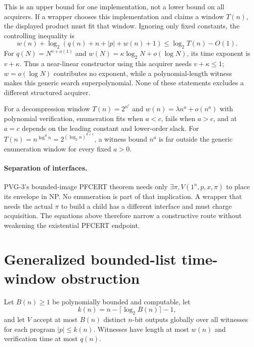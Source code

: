 \documentclass[11pt]{article}
\begin{document}
This is an upper bound for one implementation, not a lower bound on all
acquirers.  If a wrapper chooses this implementation and claims a window
$T(n)$, the displayed product must fit that window.  Ignoring only fixed
constants, the controlling inequality is
\[
 w(n)+\log_2(q(n)+n+|p|+w(n)+1)
 \le \log_2 T(n)-O(1).                 \tag{1}
\]
For $q(N)=N^{v+o(1)}$ and
$w(N)=\kappa\log_2N+o(\log N)$, its time exponent is
$v+\kappa$.  Thus a near-linear constructor using this acquirer needs
$v+\kappa\le1$; $w=o(\log N)$ contributes no exponent, while a
polynomial-length witness makes this generic search superpolynomial.
None of these statements excludes a different structured acquirer.

For a decompression window $T(n)=2^{n^c}$ and
$w(n)=\lambda n^a+o(n^a)$ with polynomial verification, enumeration fits
when $a<c$, fails when $a>c$, and at $a=c$ depends on the leading constant
and lower-order slack.  For
$T(n)=n^{\log^d n}=2^{(\log_2 n)^{d+1}}$, a witness bound $n^a$ is far
outside the generic enumeration window for every fixed $a>0$.

\paragraph{Separation of interfaces.}
PVG-3's bounded-image PFCERT theorem needs only
$\exists\pi,V(1^n,p,x,\pi)$ to place its envelope in NP.  No enumeration
is part of that implication.  A wrapper that needs the actual $\pi$ to
build a child has a different interface and must charge acquisition.  The
equations above therefore narrow a constructive route without weakening
the existential PFCERT endpoint.

\section{Generalized bounded-list time-window obstruction}
Let $B(n)\ge1$ be polynomially bounded and computable, let
\[
 k(n)=n-\lceil\log_2 B(n)\rceil-1,
\]
and let $V$ accept at most $B(n)$ distinct $n$-bit outputs globally over
all witnesses for each program $|p|\le k(n)$.  Witnesses have length at
most $w(n)$ and verification time at most $q(n)$.
\end{document}
